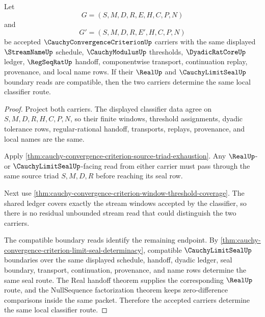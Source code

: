 \begin{theorem}
\label{thm:cauchy-convergence-criterion-ledger-classifier-exactness}
Let
$$
G=(S,M,D,R,E,H,C,P,N)
$$
and
$$
G'=(S,M,D,R,E',H,C,P,N)
$$
be accepted $\CauchyConvergenceCriterionUp$ carriers with the same displayed $\StreamNameUp$ schedule, $\CauchyModulusUp$ thresholds, $\DyadicRatCoreUp$ ledger, $\RegSeqRatUp$ handoff, componentwise transport, continuation replay, provenance, and local name rows. If their $\RealUp$ and $\CauchyLimitSealUp$ boundary reads are compatible, then the two carriers determine the same local classifier route.
\end{theorem}
\begin{proof}
Project both carriers. The displayed classifier data agree on $S,M,D,R,H,C,P,N$, so their finite windows, threshold assignments, dyadic tolerance rows, regular-rational handoff, transports, replays, provenance, and local names are the same.

Apply \autoref{thm:cauchy-convergence-criterion-source-triad-exhaustion}. Any $\RealUp$- or $\CauchyLimitSealUp$-facing read from either carrier must pass through the same source triad $S,M,D,R$ before reaching its seal row.

Next use \autoref{thm:cauchy-convergence-criterion-window-threshold-coverage}. The shared ledger covers exactly the stream windows accepted by the classifier, so there is no residual unbounded stream read that could distinguish the two carriers.

The compatible boundary reads identify the remaining endpoint. By \autoref{thm:cauchy-convergence-criterion-limit-seal-determinacy}, compatible $\CauchyLimitSealUp$ boundaries over the same displayed schedule, handoff, dyadic ledger, seal boundary, transport, continuation, provenance, and name rows determine the same seal route. The Real handoff theorem supplies the corresponding $\RealUp$ route, and the NullSequence factorization theorem keeps zero-difference comparisons inside the same packet. Therefore the accepted carriers determine the same local classifier route.
\end{proof}

